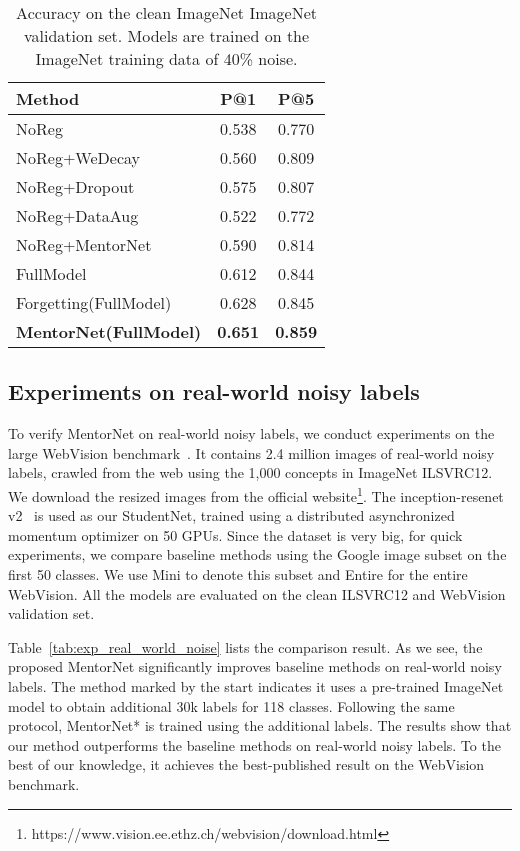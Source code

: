 \documentclass{article}
\begin{document}
\begin{table}[ht]
\vspace{-3mm}
\centering
\caption{\label{tab:exp_imagenet} Accuracy on the clean ImageNet ImageNet validation set. Models are trained on the ImageNet training data of 40\% noise.}
\small
\begin{tabular}{l|cc}
\hline
Method & P@1 & P@5 \\
\hline
NoReg &  0.538 & 0.770  \\
NoReg+WeDecay &  0.560 & 0.809  \\
NoReg+Dropout & 0.575&0.807\\
NoReg+DataAug&  0.522 & 0.772  \\
NoReg+MentorNet&0.590& 0.814\\
\hline
FullModel&  0.612 & 0.844  \\
Forgetting(FullModel) &0.628&0.845\\
\textbf{MentorNet(FullModel)} &\textbf{0.651}&\textbf{0.859}\\
\hline
\end{tabular}
\vspace{-5mm}
\end{table}



\vspace{-2mm}
\subsection{Experiments on real-world noisy labels}
\label{sec:exp_part3}
\vspace{-2mm}
To verify MentorNet on real-world noisy labels, we conduct experiments on the large WebVision benchmark~\cite{li2017webvision}. It contains 2.4 million images of real-world noisy labels, crawled from the web using the 1,000 concepts in ImageNet ILSVRC12. We download the resized images from the official website\footnote{https://www.vision.ee.ethz.ch/webvision/download.html}. The inception-resenet v2~\cite{szegedy2017inception} is used as our StudentNet, trained using a distributed asynchronized momentum optimizer on 50 GPUs. Since the dataset is very big, for quick experiments, we compare baseline methods using the Google image subset on the first 50 classes. We use Mini to denote this subset and Entire for the entire WebVision. All the models are evaluated on the clean ILSVRC12 and WebVision validation set.

Table~\ref{tab:exp_real_world_noise} lists the comparison result. As we see, the proposed MentorNet significantly improves baseline methods on real-world noisy labels. The method marked by the start indicates it uses a pre-trained ImageNet model to obtain additional 30k labels for 118 classes. Following the same protocol, MentorNet* is trained using the additional labels. The results show that our method outperforms the baseline methods on real-world noisy labels. To the best of our knowledge, it achieves the best-published result on the WebVision~\cite{li2017webvision} benchmark.
\end{document}
